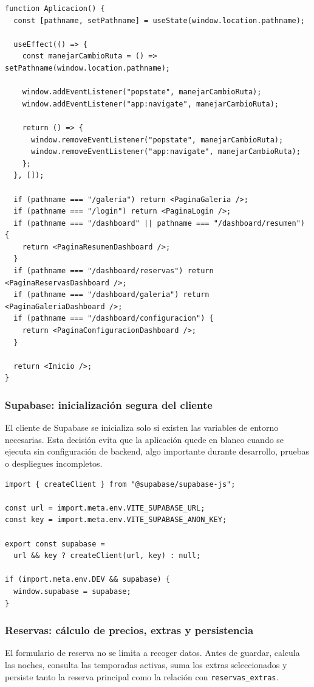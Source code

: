 \documentclass[11pt,a4paper]{article}
\begin{document}
\begin{verbatim}
function Aplicacion() {
  const [pathname, setPathname] = useState(window.location.pathname);

  useEffect(() => {
    const manejarCambioRuta = () => setPathname(window.location.pathname);

    window.addEventListener("popstate", manejarCambioRuta);
    window.addEventListener("app:navigate", manejarCambioRuta);

    return () => {
      window.removeEventListener("popstate", manejarCambioRuta);
      window.removeEventListener("app:navigate", manejarCambioRuta);
    };
  }, []);

  if (pathname === "/galeria") return <PaginaGaleria />;
  if (pathname === "/login") return <PaginaLogin />;
  if (pathname === "/dashboard" || pathname === "/dashboard/resumen") {
    return <PaginaResumenDashboard />;
  }
  if (pathname === "/dashboard/reservas") return <PaginaReservasDashboard />;
  if (pathname === "/dashboard/galeria") return <PaginaGaleriaDashboard />;
  if (pathname === "/dashboard/configuracion") {
    return <PaginaConfiguracionDashboard />;
  }

  return <Inicio />;
}
\end{verbatim}

\subsubsection{Supabase: inicialización segura del cliente}
El cliente de Supabase se inicializa solo si existen las variables de entorno necesarias. Esta decisión evita que la aplicación quede en blanco cuando se ejecuta sin configuración de backend, algo importante durante desarrollo, pruebas o despliegues incompletos.

\begin{verbatim}
import { createClient } from "@supabase/supabase-js";

const url = import.meta.env.VITE_SUPABASE_URL;
const key = import.meta.env.VITE_SUPABASE_ANON_KEY;

export const supabase =
  url && key ? createClient(url, key) : null;

if (import.meta.env.DEV && supabase) {
  window.supabase = supabase;
}
\end{verbatim}

\subsubsection{Reservas: cálculo de precios, extras y persistencia}
El formulario de reserva no se limita a recoger datos. Antes de guardar, calcula las noches, consulta las temporadas activas, suma los extras seleccionados y persiste tanto la reserva principal como la relación con \texttt{reservas\_extras}.
\end{document}
